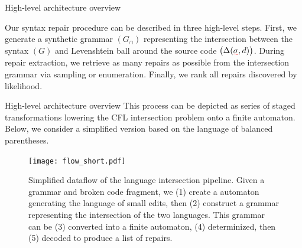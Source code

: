 \documentclass{beamer}
\begin{document}
\begin{frame}[fragile]{High-level architecture overview}
\begin{figure}
{
}
\end{figure}

  Our syntax repair procedure can be described in three high-level steps. First, we generate a synthetic grammar $(G_\cap)$ representing the intersection between the syntax $(G)$ and Levenshtein ball around the source code $\big(\Delta(\err\sigma, d)\big)$. During repair extraction, we retrieve as many repairs as possible from the intersection grammar via sampling or enumeration. Finally, we rank all repairs discovered by likelihood.

\end{frame}


\begin{frame}[fragile]{High-level architecture overview}
This process can be depicted as series of staged transformations lowering the CFL intersection problem onto a finite automaton. Below, we consider a simplified version based on the language of balanced parentheses.

\vspace{0.3cm}
\begin{figure}[H]
\centering
\texttt{[image: flow\_short.pdf]}
\vspace{0.1cm}
\caption{Simplified dataflow of the language intersection pipeline. Given a grammar and broken code fragment, we (1) create a automaton generating the language of small edits, then (2) construct a grammar representing the intersection of the two languages. This grammar can be (3) converted into a finite automaton, (4) determinized, then (5) decoded to produce a list of repairs.}
\label{fig:exampleDFA}
\end{figure}
\end{frame}
\end{document}
